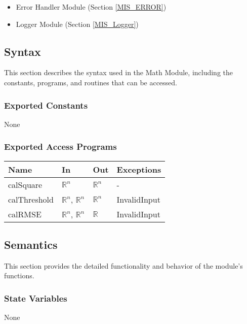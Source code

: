 \documentclass[12pt, titlepage]{article}
\begin{document}
\begin{itemize}
\item Error Handler Module (Section \ref{MIS_ERROR})
\item Logger Module (Section \ref{MIS_Logger})
\end{itemize}

\subsection{Syntax}

This section describes the syntax used in the Math Module, including the
constants, programs, and routines that can be accessed.

\subsubsection{Exported Constants}

None

\subsubsection{Exported Access Programs}

\begin{center}
\begin{tabular}{p{2.5cm} p{4.5cm} p{4.5cm} p{2.5cm}}
\hline
\textbf{Name} & \textbf{In} & \textbf{Out} & \textbf{Exceptions} \\
\hline
calSquare & $\mathbb{R}^n$ & $\mathbb{R}^n$ & - \\
calThreshold & $\mathbb{R}^n$, $\mathbb{R}^n$ & $\mathbb{R}^n$ & InvalidInput \\
calRMSE & $\mathbb{R}^n$, $\mathbb{R}^n$ & $\mathbb{R}$ & InvalidInput \\
\hline
\end{tabular}
\end{center}

\subsection{Semantics}

This section provides the detailed functionality and behavior of the module’s
functions.

\subsubsection{State Variables}

None
\end{document}
